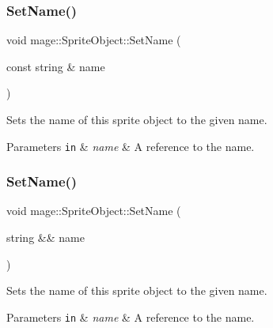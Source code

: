 \subsubsection{\texorpdfstring{Set\+Name()}{SetName()}\hspace{0.1cm}{\footnotesize\ttfamily [1/2]}}
{\footnotesize\ttfamily void mage\+::\+Sprite\+Object\+::\+Set\+Name (\begin{DoxyParamCaption}\item[{const string \&}]{name }\end{DoxyParamCaption})}

Sets the name of this sprite object to the given name.


\begin{DoxyParams}[1]{Parameters}
\mbox{\tt in}  & {\em name} & A reference to the name. \\
\hline
\end{DoxyParams}
\hypertarget{classmage_1_1_sprite_object_a62d570d43c7b83042f0709fef6e273f4}{}\label{classmage_1_1_sprite_object_a62d570d43c7b83042f0709fef6e273f4} 
\subsubsection{\texorpdfstring{Set\+Name()}{SetName()}\hspace{0.1cm}{\footnotesize\ttfamily [2/2]}}
{\footnotesize\ttfamily void mage\+::\+Sprite\+Object\+::\+Set\+Name (\begin{DoxyParamCaption}\item[{string \&\&}]{name }\end{DoxyParamCaption})\hspace{0.3cm}{\ttfamily [noexcept]}}

Sets the name of this sprite object to the given name.


\begin{DoxyParams}[1]{Parameters}
\mbox{\tt in}  & {\em name} & A reference to the name. \\
\hline
\end{DoxyParams}
\hypertarget{classmage_1_1_sprite_object_aef6cf252d79c9fcec978d83642da0e9a}{}\label{classmage_1_1_sprite_object_aef6cf252d79c9fcec978d83642da0e9a} 
